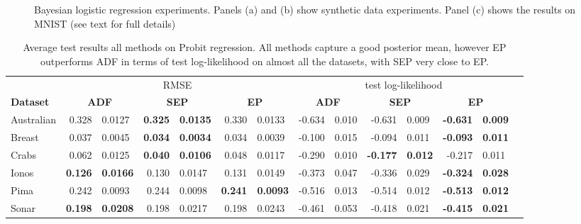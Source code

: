 \begin{figure}
\centering
\def\svgwidth{0.31\linewidth}
\subfigure[\label{fig:sep_probit}]{
}
%
%
\def\svgwidth{0.31\linewidth}
\subfigure[\label{fig:daep_probit}]{
}
%
%
\def\svgwidth{0.31\linewidth}
\subfigure[\label{fig:mnist}]{
}
\caption{Bayesian logistic regression experiments. Panels (a) and (b) show synthetic data experiments. Panel (c) shows the results on MNIST (see text for full details)}
\end{figure}

\begin{table} 
\small
\centering \label{tab:probit_results} \begin{tabular}{l@{\ica}r@{$\pm$}l@{\ica}r@{$\pm$}l@{\ica}r@{$\pm$}l@{\ica}r@{$\pm$}l@{\ica}r@{$\pm$}
	l@{\ica}r@{$\pm$}l@{\ica}r@{$\pm$}}\hline 
{} & \multicolumn{6}{c}{RMSE} & \multicolumn{6}{c}{test log-likelihood} \\
\bf{Dataset}&\multicolumn{2}{c}{\bf{ ADF }}&\multicolumn{2}{c}{\bf{ SEP }}&\multicolumn{2}{c}{\bf{ EP }} &\multicolumn{2}{c}{\bf{ ADF }}&\multicolumn{2}{c}{\bf{ SEP }}&\multicolumn{2}{c}{\bf{ EP }} \\ \hline 
%
Australian&0.328&0.0127&\bf{0.325}&\bf{0.0135}&0.330&0.0133
	&-0.634&0.010&-0.631&0.009&\bf{-0.631}&\bf{0.009}\\
%
Breast&0.037&0.0045&\bf{0.034}&\bf{0.0034}&0.034&0.0039
	&-0.100&0.015&-0.094&0.011&\bf{-0.093}&\bf{0.011}\\
%
Crabs&0.062&0.0125&\bf{0.040}&\bf{0.0106}&0.048&0.0117
	&-0.290&0.010&\bf{-0.177}&\bf{0.012}&-0.217&0.011\\
%
Ionos&\bf{0.126}&\bf{0.0166}&0.130&0.0147&0.131&0.0149
	&-0.373&0.047&-0.336&0.029&\bf{-0.324}&\bf{0.028}\\
%
Pima&0.242&0.0093&0.244&0.0098&\bf{0.241}&\bf{0.0093}
	&-0.516&0.013&-0.514&0.012&\bf{-0.513}&\bf{0.012}\\
%
Sonar&\bf{0.198}&\bf{0.0208}&0.198&0.0217&0.198&0.0243
	&-0.461&0.053&-0.418&0.021&\bf{-0.415}&\bf{0.021}\\
 \hline \end{tabular} 
 \caption{ Average test results all methods on Probit regression. All methods capture a good posterior mean, however EP outperforms ADF in terms of test log-likelihood on almost all the datasets, with SEP very close to EP.}
 \end{table} 
 
